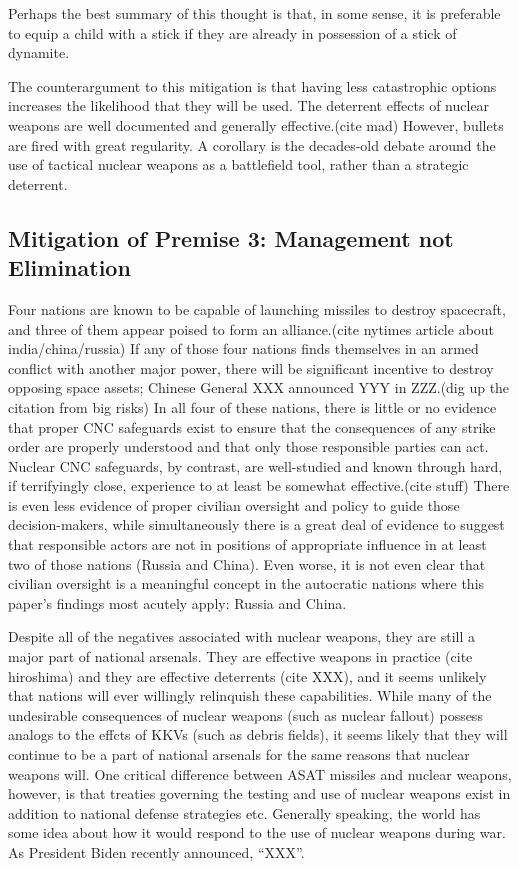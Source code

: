 Perhaps the best summary of this thought is that, in some sense, it is
preferable to equip a child with a stick if they are already in
possession of a stick of dynamite.

The counterargument to this mitigation is that having less
catastrophic options increases the likelihood that they will be used.
The deterrent effects of nuclear weapons are well documented and
generally effective.(cite mad) However, bullets are fired with great
regularity.  A corollary is the decades-old debate around the use of
tactical nuclear weapons as a battlefield tool, rather than a
strategic deterrent.

\subsection{Mitigation of Premise 3: Management not Elimination}
Four nations are known to be capable of launching missiles to destroy
spacecraft, and three of them appear poised to form an alliance.(cite
nytimes article about india/china/russia) If any of those four nations
finds themselves in an armed conflict with another major power, there
will be significant incentive to destroy opposing space assets;
Chinese General XXX announced YYY in ZZZ.(dig up the citation from big
risks) In all four of these nations, there is little or no evidence
that proper CNC safeguards exist to ensure that the consequences of
any strike order are properly understood and that only those
responsible parties can act.  Nuclear CNC safeguards, by contrast, are
well-studied and known through hard, if terrifyingly close, experience
to at least be somewhat effective.(cite stuff) There is even less
evidence of proper civilian oversight and policy to guide those
decision-makers, while simultaneously there is a great deal of
evidence to suggest that responsible actors are not in positions of
appropriate influence in at least two of those nations (Russia and
China).  Even worse, it is not even clear that civilian oversight is a
meaningful concept in the autocratic nations where this paper's
findings most acutely apply: Russia and China.

Despite all of the negatives associated with nuclear weapons, they are
still a major part of national arsenals.  They are effective weapons
in practice (cite hiroshima) and they are effective deterrents (cite
XXX), and it seems unlikely that nations will ever willingly
relinquish these capabilities.  While many of the undesirable
consequences of nuclear weapons (such as nuclear fallout) possess
analogs to the effcts of KKVs (such as debris fields), it seems likely
that they will continue to be a part of national arsenals for the same
reasons that nuclear weapons will.  One critical difference between
ASAT missiles and nuclear weapons, however, is that treaties governing
the testing and use of nuclear weapons exist in addition to national
defense strategies etc.  Generally speaking, the world has some idea
about how it would respond to the use of nuclear weapons during war.
As President Biden recently announced, ``XXX''.

